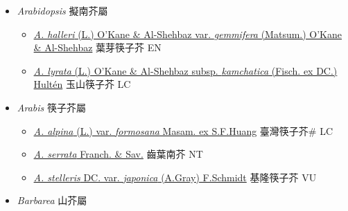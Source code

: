 
  \begin{itemize}
 \item[] \textit{Arabidopsis} 擬南芥屬
                    
  \begin{itemize}
        \item[] \href{http://www.theplantlist.org/tpl1.1/search?q=Arabidopsis+halleri+var.+gemmifera}{\textit{A. halleri} (L.) O'Kane \& Al-Shehbaz var. \textit{gemmifera} (Matsum.) O'Kane \& Al-Shehbaz}     葉芽筷子芥 EN
        \item[] \href{http://www.theplantlist.org/tpl1.1/search?q=Arabidopsis+lyrata+subsp.+kamchatica}{\textit{A. lyrata} (L.) O'Kane \& Al-Shehbaz subsp. \textit{kamchatica} (Fisch. ex DC.) Hultén}     玉山筷子芥 LC
  \end{itemize}
 \item[] \textit{Arabis} 筷子芥屬
                    
  \begin{itemize}
        \item[] \href{http://www.theplantlist.org/tpl1.1/search?q=Arabis+alpina+var.+formosana}{\textit{A. alpina} (L.) var. \textit{formosana} Masam. ex S.F.Huang}     臺灣筷子芥\# LC
        \item[] \href{http://www.theplantlist.org/tpl1.1/search?q=Arabis+serrata}{\textit{A. serrata} Franch. \& Sav.}   齒葉南芥 NT
        \item[] \href{http://www.theplantlist.org/tpl1.1/search?q=Arabis+stelleris+var.+japonica}{\textit{A. stelleris} DC. var. \textit{japonica} (A.Gray) F.Schmidt}   基隆筷子芥 VU
  \end{itemize}
 \item[] \textit{Barbarea} 山芥屬
                    

\end{itemize}
